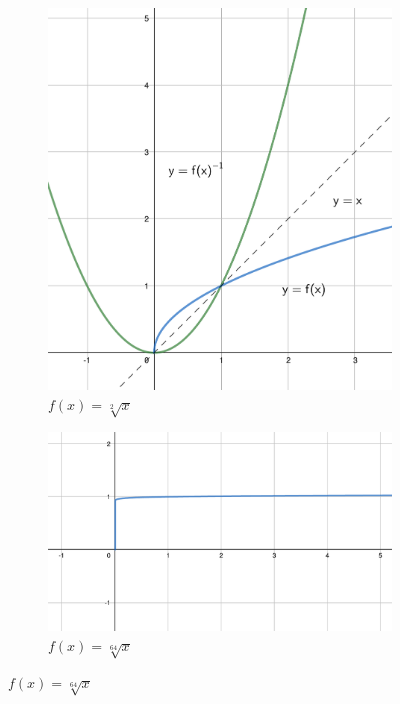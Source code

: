 \begin{figure}[h]
    \centering
    \begin{subfigure}{0.35\textwidth}
        \includegraphics[width=\textwidth]{tex/chapter_2/assets/y=x^(1_div_by_2).pdf}
        \caption*{$f(x) = \sqrt[2]{x}$}
    \end{subfigure}
    \hfill
    \begin{subfigure}{0.5\textwidth}
        \includegraphics[width=\textwidth]{tex/chapter_2/assets/y=x^(1_div_by_64).pdf}
        \caption*{$f(x) = \sqrt[64]{x}$}
    \end{subfigure}
\end{figure}